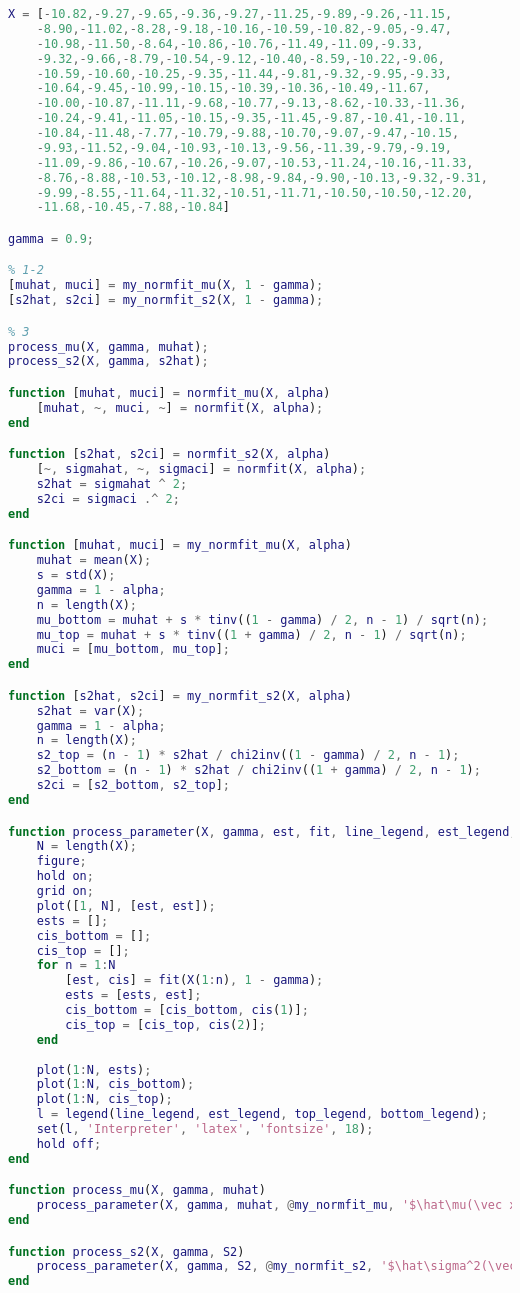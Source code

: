 \documentclass[12pt]{report}
\begin{document}
\begin{lstlisting}[language=Matlab]
X = [-10.82,-9.27,-9.65,-9.36,-9.27,-11.25,-9.89,-9.26,-11.15,
	-8.90,-11.02,-8.28,-9.18,-10.16,-10.59,-10.82,-9.05,-9.47,
	-10.98,-11.50,-8.64,-10.86,-10.76,-11.49,-11.09,-9.33,
	-9.32,-9.66,-8.79,-10.54,-9.12,-10.40,-8.59,-10.22,-9.06,
	-10.59,-10.60,-10.25,-9.35,-11.44,-9.81,-9.32,-9.95,-9.33,
	-10.64,-9.45,-10.99,-10.15,-10.39,-10.36,-10.49,-11.67,
	-10.00,-10.87,-11.11,-9.68,-10.77,-9.13,-8.62,-10.33,-11.36,
	-10.24,-9.41,-11.05,-10.15,-9.35,-11.45,-9.87,-10.41,-10.11,
	-10.84,-11.48,-7.77,-10.79,-9.88,-10.70,-9.07,-9.47,-10.15,
	-9.93,-11.52,-9.04,-10.93,-10.13,-9.56,-11.39,-9.79,-9.19,
	-11.09,-9.86,-10.67,-10.26,-9.07,-10.53,-11.24,-10.16,-11.33,
	-8.76,-8.88,-10.53,-10.12,-8.98,-9.84,-9.90,-10.13,-9.32,-9.31,
	-9.99,-8.55,-11.64,-11.32,-10.51,-11.71,-10.50,-10.50,-12.20,
	-11.68,-10.45,-7.88,-10.84]

gamma = 0.9;

% 1-2
[muhat, muci] = my_normfit_mu(X, 1 - gamma);
[s2hat, s2ci] = my_normfit_s2(X, 1 - gamma);

% 3
process_mu(X, gamma, muhat);
process_s2(X, gamma, s2hat);

function [muhat, muci] = normfit_mu(X, alpha)
	[muhat, ~, muci, ~] = normfit(X, alpha);
end

function [s2hat, s2ci] = normfit_s2(X, alpha)
	[~, sigmahat, ~, sigmaci] = normfit(X, alpha);
	s2hat = sigmahat ^ 2;
	s2ci = sigmaci .^ 2;
end

function [muhat, muci] = my_normfit_mu(X, alpha)
	muhat = mean(X);
	s = std(X);
	gamma = 1 - alpha;
	n = length(X);
	mu_bottom = muhat + s * tinv((1 - gamma) / 2, n - 1) / sqrt(n);
	mu_top = muhat + s * tinv((1 + gamma) / 2, n - 1) / sqrt(n);
	muci = [mu_bottom, mu_top];
end

function [s2hat, s2ci] = my_normfit_s2(X, alpha)
	s2hat = var(X);
	gamma = 1 - alpha;
	n = length(X);
	s2_top = (n - 1) * s2hat / chi2inv((1 - gamma) / 2, n - 1);
	s2_bottom = (n - 1) * s2hat / chi2inv((1 + gamma) / 2, n - 1);
	s2ci = [s2_bottom, s2_top];
end

function process_parameter(X, gamma, est, fit, line_legend, est_legend, top_legend, bottom_legend)
	N = length(X);
	figure;
	hold on;
	grid on;
	plot([1, N], [est, est]);
	ests = [];
	cis_bottom = [];
	cis_top = [];
	for n = 1:N
		[est, cis] = fit(X(1:n), 1 - gamma);
		ests = [ests, est];
		cis_bottom = [cis_bottom, cis(1)];
		cis_top = [cis_top, cis(2)];
	end
	
	plot(1:N, ests);
	plot(1:N, cis_bottom);
	plot(1:N, cis_top);
	l = legend(line_legend, est_legend, top_legend, bottom_legend);
	set(l, 'Interpreter', 'latex', 'fontsize', 18);
	hold off;
end

function process_mu(X, gamma, muhat)
	process_parameter(X, gamma, muhat, @my_normfit_mu, '$\hat\mu(\vec x_N)$', '$\hat\mu(\vec x_n)$', '$\underline\mu(\vec x_n)$', '$\overline\mu(\vec x_n)$');
end

function process_s2(X, gamma, S2)
	process_parameter(X, gamma, S2, @my_normfit_s2, '$\hat\sigma^2(\vec x_N)$', '$\hat\sigma^2(\vec x_n)$', '$\underline\sigma^2(\vec x_n)$', '$\overline\sigma^2(\vec x_n)$');
end
\end{lstlisting}
\end{document}
